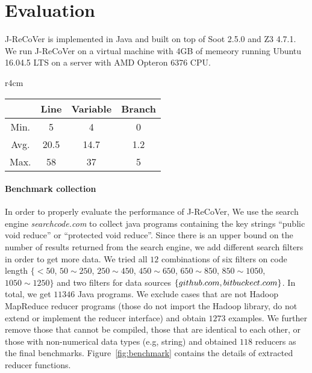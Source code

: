 \documentclass{llncs}
\begin{document}
\section{Evaluation} \label{section:exp}

J-ReCoVer is implemented in Java and built on top of Soot 2.5.0 and Z3 4.7.1. We run J-ReCoVer on a virtual machine with 4GB of memeory running Ubuntu 16.04.5 LTS on a server with AMD Opteron 6376 CPU. 


\begin{wrapfigure}{r}{4cm}
	\vspace{-0.7cm}
	\begin{tabular}{|c|c|c|c|}
		\hline
		& Line & Variable & Branch\\
		\hline
		Min. & 5 & 4 & 0\\
		Avg. & 20.5 & 14.7 & 1.2\\
		Max. & 58 & 37 & 5\\
		\hline
	\end{tabular}
	\caption{Size of the reducers}
	\label{fig:benchmark}
	\vspace{-0.5cm}
\end{wrapfigure} 

\paragraph*{Benchmark collection} In order to properly evaluate the performance of J-ReCoVer, We use the search engine \emph{searchcode.com} to collect java programs containing the key strings ``public void reduce'' or ``protected void reduce''. Since there is an upper bound on the number of results returned from the search engine, we add different search filters in order to get more data. We tried all $12$ combinations of six filters on code length $\{<50$, $ 50\sim 250$, $250\sim 450$, $450\sim 650$, $650\sim 850$, $850\sim 1050$, $1050\sim 1250\}$
and two filters for data sources $\{github.com, bitbuckect.com\}$. In total, we get $11346$ Java programs. We exclude cases that are not Hadoop MapReduce reducer programs (those do not import the Hadoop library, do not extend or implement the reducer interface) and obtain $1273$ examples. We further remove those that cannot be compiled, those that are identical to each other, or those with non-numerical data types (e.g, string) and obtained $118$ reducers as the final benchmarks. Figure~\ref{fig:benchmark} contains the details of extracted reducer functions.
\end{document}
